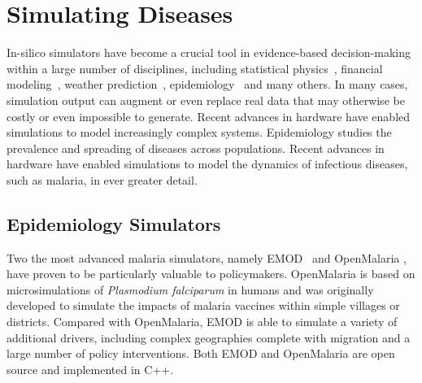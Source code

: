 \documentclass{article}
\begin{document}
 \section{Simulating Diseases}
 \label{sec:background}


In-silico simulators have become a crucial tool in evidence-based decision-making within a large number of disciplines, including statistical physics~\cite{landau_binder_2014}, financial modeling~\cite{jackel2002monte},
weather prediction~\cite{evensen1994sequential}, epidemiology~\cite{smith2008towards} and many others.
In many cases, simulation output can augment or even replace real data that may otherwise be costly or even impossible to generate.
Recent advances in hardware have enabled simulations to model increasingly complex systems.
Epidemiology studies the prevalence and spreading of diseases across populations. Recent advances in hardware have enabled simulations to model the dynamics of infectious diseases, such as malaria, in ever greater detail.

\subsection{Epidemiology Simulators}

Two the most advanced malaria simulators, namely EMOD~\cite{bershteyn2018implementation} and OpenMalaria  \cite{smith2008towards}, have proven to be particularly valuable to policymakers.
OpenMalaria is based on microsimulations of \textit{Plasmodium falciparum} in humans and was originally developed to simulate the impacts of malaria vaccines within simple villages or districts.
Compared with OpenMalaria, EMOD is able to simulate a variety of additional drivers, including complex geographies complete with migration and a large number of policy interventions.
Both EMOD and OpenMalaria are open source and implemented in C++.



\end{document}
